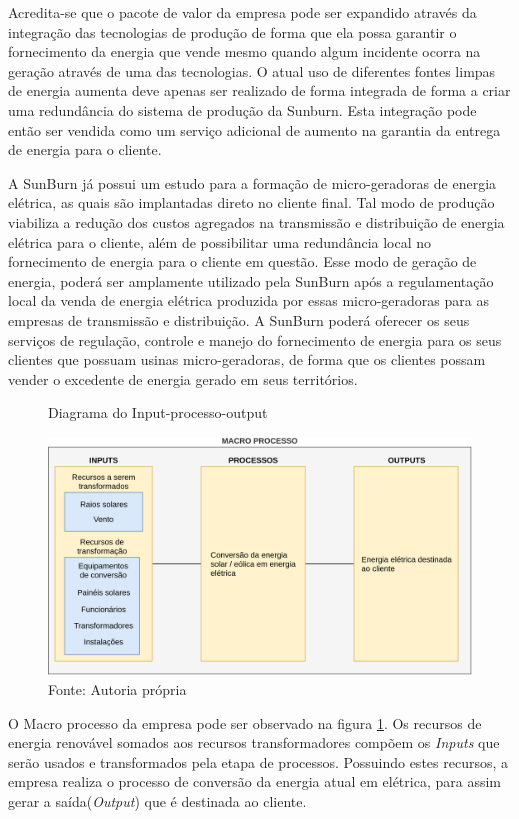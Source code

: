 Acredita-se que o pacote de valor da empresa pode ser expandido através da integração das tecnologias de produção de forma que ela possa garantir o fornecimento da energia que vende mesmo quando algum incidente ocorra na geração através de uma das tecnologias. O atual uso de diferentes fontes limpas de energia aumenta deve apenas ser realizado de forma integrada de forma a criar uma redundância do sistema de produção da Sunburn. Esta integração pode então ser vendida como um serviço adicional de aumento na garantia da entrega de energia para o cliente.

A SunBurn já possui um estudo para a formação de micro-geradoras de energia elétrica, as quais são implantadas direto no cliente final. Tal modo de produção viabiliza a redução dos custos agregados na transmissão e distribuição de energia elétrica para o cliente, além de possibilitar uma redundância local no fornecimento de energia para o cliente em questão. Esse modo de geração de energia, poderá ser amplamente utilizado pela SunBurn após a regulamentação local da venda de energia elétrica produzida por essas micro-geradoras para as empresas de transmissão e distribuição. A SunBurn poderá oferecer os seus serviços de regulação, controle e manejo do fornecimento de energia para os seus clientes que possuam usinas micro-geradoras, de forma que os clientes possam vender o excedente de energia gerado em seus territórios.

\begin{figure}[H]
    \caption{Diagrama do Input-processo-output}
    \includegraphics[width = 1\textwidth]{images/diagram.png}
    \caption*{Fonte: Autoria própria}
    \label{fig:gestao_operacoes_aplicacao_diagrama}
\end{figure}

O Macro processo da empresa pode ser observado na figura \ref{fig:gestao_operacoes_aplicacao_diagrama}. Os recursos de energia renovável somados aos recursos transformadores compõem os \textit{Inputs} que serão usados e transformados pela etapa de processos. Possuindo estes recursos, a empresa realiza o processo de conversão da energia atual em elétrica, para assim gerar a saída(\textit{Output}) que é destinada ao cliente.



